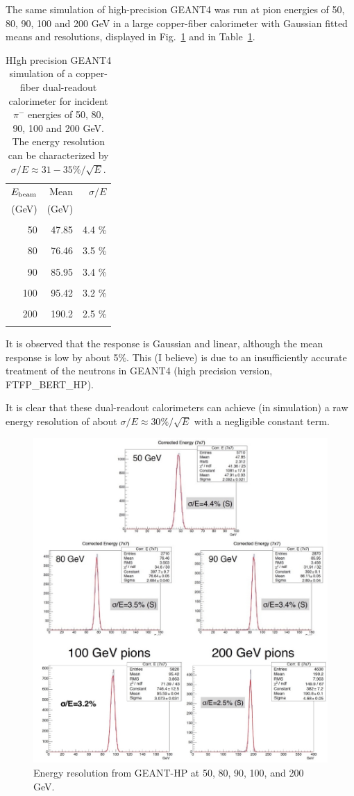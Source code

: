 The same simulation of high-precision GEANT4 was run at pion energies of 50, 80, 90, 100 and 200 GeV in a large
copper-fiber calorimeter with Gaussian fitted  means and resolutions, displayed in Fig.~\ref{fig:eres} and in Table~\ref{tab:dream:pionEnergies}.
\begin{table}
  \centering
\begin{tabular}{ r r r }
$E_{\rm beam}$   &  Mean         &  $\sigma/E$ \\
   (GeV)    &   (GeV)       &   \\
\hline
 & & \\
 50    &    47.85   & 4.4 \% \\
 &&\\
 80   & 76.46     &  3.5 \% \\
 &&\\
 90  & 85.95    &   3.4 \% \\
 &&\\
 100  & 95.42  &  3.2 \% \\
 &&\\
 200  & 190.2  &  2.5 \% \\
 &&\\
 \end{tabular}
 \caption{HIgh precision GEANT4 simulation of a copper-fiber dual-readout calorimeter for incident $\pi^-$ energies of 50, 80, 90, 100 and 200 GeV.  The energy resolution can be characterized by $\sigma/E \approx 31-35 \% / \sqrt{E}$.}
 \label{tab:dream:pionEnergies}
\end{table}

 It is observed that the response is Gaussian and linear, although the mean response is low by about 5\%.  This (I believe) is due to an insufficiently accurate treatment of the neutrons in GEANT4 (high precision version, FTFP\_BERT\_HP).
 
 It is clear that these dual-readout calorimeters can achieve (in simulation) a raw energy resolution of about $\sigma/E \approx 30\% / \sqrt{E}$ with a negligible constant term.  

\begin{figure}
 \centering
 \includegraphics[width=0.5\linewidth]{Calorimeter/DualReadout/eres.jpg}
  \caption{Energy resolution from GEANT-HP at 50, 80, 90, 100, and 200 GeV.}
  \label{fig:eres}
\end{figure}


